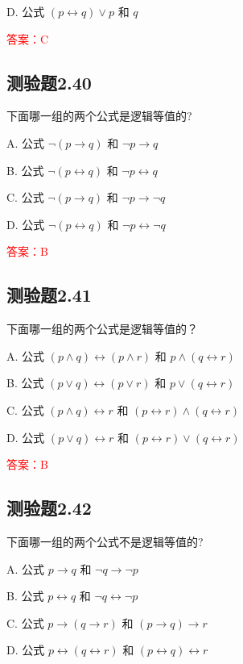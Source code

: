 \documentclass[UTF8, heading=true]{ctexart}
\begin{document}
D. 公式 $(p \leftrightarrow q) \vee p$ 和 $q$

\textcolor{red}{答案：C}

\subsection{测验题2.40}

下面哪一组的两个公式是逻辑等值的?

A. 公式 $\neg(p \rightarrow q)$ 和 $\neg p \rightarrow q$

B. 公式 $\neg(p \leftrightarrow q)$ 和 $\neg p \leftrightarrow q$

C. 公式 $\neg(p \rightarrow q)$ 和 $\neg p \rightarrow \neg q$

D. 公式 $\neg(p \leftrightarrow q)$ 和 $\neg p \leftrightarrow \neg q$

\textcolor{red}{答案：B}



\subsection{测验题2.41}

下面哪一组的两个公式是逻辑等值的？

A. 公式 $(p \wedge q) \leftrightarrow(p \wedge r)$ 和 $p \wedge(q \leftrightarrow r)$

B. 公式 $(p \vee q) \leftrightarrow(p \vee r)$ 和 $p \vee(q \leftrightarrow r)$

C. 公式 $(p \wedge q) \leftrightarrow r$ 和 $(p \leftrightarrow r) \wedge(q \leftrightarrow r)$

D. 公式 $(p \vee q) \leftrightarrow r$ 和 $(p \leftrightarrow r) \vee(q \leftrightarrow r)$

\textcolor{red}{答案：B}

\subsection{测验题2.42}

下面哪一组的两个公式不是逻辑等值的?

A. 公式 $p \rightarrow q$ 和 $\neg q \rightarrow \neg p$

B. 公式 $p \leftrightarrow q$ 和 $\neg q \leftrightarrow \neg p$

C. 公式 $p \rightarrow(q \rightarrow r)$ 和 $(p \rightarrow q) \rightarrow r$

D. 公式 $p \leftrightarrow(q \leftrightarrow r)$ 和 $(p \leftrightarrow q) \leftrightarrow r$
\end{document}
